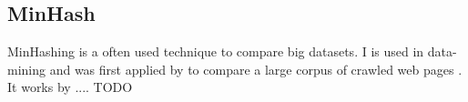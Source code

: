 \subsection{MinHash}
\label{ssec:minhash}

MinHashing is a often used technique to compare big datasets. I is used in data-mining and was first applied by \citeauthor{minhash} to compare a large corpus of crawled web pages \cite{minhash}. It works by .... TODO

